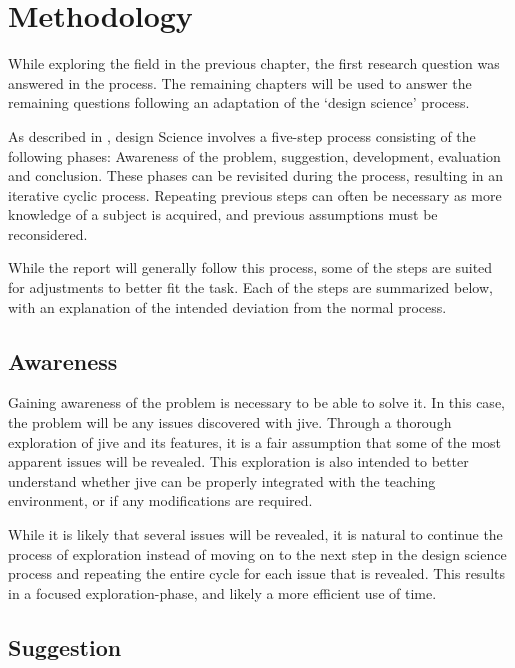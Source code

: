 \chapter{Methodology}\label{methodology}%

While exploring the field in the previous chapter, the first research question was answered in the process.
The remaining chapters will be used to answer the remaining questions following an adaptation of the `design science' process.

As described in \cite{Vaishnavi2004}, design Science involves a five-step process consisting of the following phases: Awareness of the problem, suggestion, development, evaluation and conclusion.
These phases can be revisited during the process, resulting in an iterative cyclic process.
Repeating previous steps can often be necessary as more knowledge of a subject is acquired, and previous assumptions must be reconsidered.

While the report will generally follow this process, some of the steps are suited for adjustments to better fit the task.
Each of the steps are summarized below, with an explanation of the intended deviation from the normal process.

\section{Awareness}\label{methAware}

Gaining awareness of the problem is necessary to be able to solve it.
In this case, the problem will be any issues discovered with \gls{jive}.
Through a thorough exploration of \gls{jive} and its features, it is a fair assumption that some of the most apparent issues will be revealed.
This exploration is also intended to better understand whether \gls{jive} can be properly integrated with the teaching environment, or if any modifications are required.

While it is likely that several issues will be revealed, it is natural to continue the process of exploration instead of moving on to the next step in the design science process and repeating the entire cycle for each issue that is revealed.
This results in a focused exploration-phase, and likely a more efficient use of time.

\section{Suggestion}\label{methSuggest}

